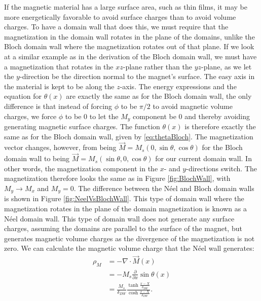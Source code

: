\documentclass[12pt, a4paper, twoside, openright]{article}		%
\numberwithin{equation}{section}
\begin{document}
If the magnetic material has a large surface area, such as thin films, it may be more energetically favorable to avoid surface charges than to avoid volume charges. To have a domain wall that does this, we must require that the magnetization in the domain wall rotates in the plane of the domains, unlike the Bloch domain wall where the magnetization rotates out of that plane. If we look at a similar example as in the derivation of the Bloch domain wall, we must have a magnetization that rotates in the $xz$-plane rather than the $yz$-plane, as we let the $y$-direction be the direction normal to the magnet's surface. The easy axis in the material is kept to be along the $z$-axis. The energy expressions and the equation for $\theta (x)$ are exactly the same as for the Bloch domain wall, the only difference is that instead of forcing $\phi$ to be $\pi/2$ to avoid magnetic volume charges, we force $\phi$ to be 0 to let the $M_y$ component be 0 and thereby avoiding generating magnetic surface charges. The function $\theta(x)$ is therefore exactly the same as for the Bloch domain wall, given by \eqref{eq:thetaBloch}. The magnetization vector changes, however, from being $\vec{M} = M_s(0, \sin\theta, \cos\theta)$ for the Bloch domain wall to being $\vec{M} = M_s(\sin\theta, 0, \cos\theta)$ for our current domain wall. In other words, the magnetization component in the $x$- and $y$-directions switch. The magnetization therefore looks the same as in Figure \ref{fig:BlochWall}, with $M_y \rightarrow M_x$ and $M_y=0$. The difference between the N\'{e}el and Bloch domain walls is shown in Figure \ref{fig:NeelVsBlochWall}. This type of domain wall where the magnetization rotates in the plane of the domain magnetization is known as a N\'{e}el domain wall. This type of domain wall does not generate any surface charges, assuming the domains are parallel to the surface of the magnet, but generates magnetic volume charges as the divergence of the magnetization is not zero. We can calculate the magnetic volume charge that the N\'{e}el wall generates:
\begin{align}
\nonumber\rho_M &= -\nabla\cdot\vec{M}(x) \\
\nonumber&= -M_s \frac{\partial}{\partial x} \sin \theta(x) \\
&= \frac{M_s}{\delta_{DW}}\frac{\tanh\frac{x-X}{\delta_{DW}}}{\cosh\frac{x-X}{\delta_{DW}}}.
\end{align}
\end{document}
